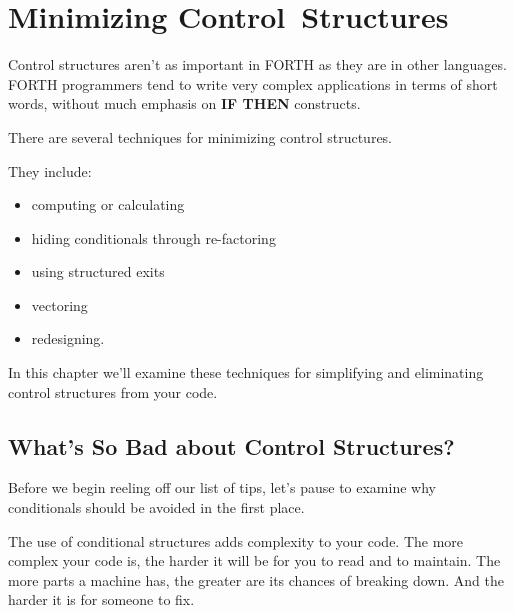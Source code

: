 

\chapter{Minimizing Control~Structures}

Control structures aren't as important in FORTH as they are in other
languages. FORTH programmers tend to write very complex applications
in terms of short words, without much emphasis on \textbf{IF THEN}
constructs.

There are several techniques for minimizing control structures.

They include:

\begin{itemize}
\item computing or calculating
\item hiding conditionals through re-factoring
\item using structured exits
\item vectoring
\item redesigning.
\end{itemize}

In this chapter we'll examine these techniques for simplifying and
eliminating control structures from your code.

\section{What's So Bad about Control Structures?}

Before we begin reeling off our list of tips, let's pause to examine why
conditionals should be avoided in the first place.

The use of conditional structures adds complexity to your code. The
more complex your code is, the harder it will be for you to read and to
maintain. The more parts a machine has, the greater are its chances of
breaking down. And the harder it is for someone to fix.

